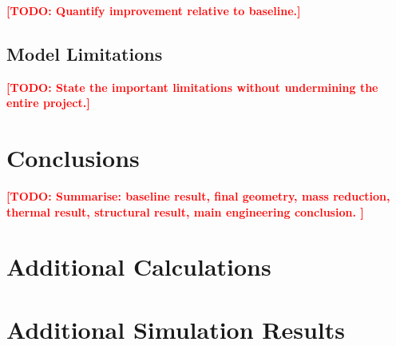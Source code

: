 \documentclass[11pt,a4paper]{article}
\newcommand{\todo}[1]{\textcolor{red}{\textbf{[TODO: #1]}}}
\begin{document}
\todo{Quantify improvement relative to baseline.}


\subsection{Model Limitations}

%

\todo{State the important limitations without undermining the entire project.}


\section{Conclusions}

%

\todo{
Summarise:
baseline result,
final geometry,
mass reduction,
thermal result,
structural result,
main engineering conclusion.
}








\appendix

\section{Additional Calculations}



\section{Additional Simulation Results}

\end{document}
